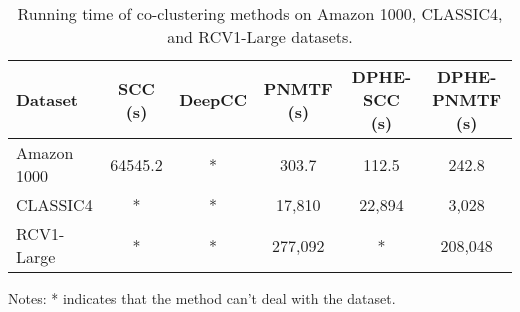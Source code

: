 
\begin{table*}[htbp]
    \centering
    \caption{Running time of co-clustering methods on Amazon 1000, CLASSIC4, and RCV1-Large datasets.}
    \label{tab:running-time}
    \begin{tabular}{@{} l ccccc @{}}
        \toprule
        Dataset     & SCC (s) & DeepCC & PNMTF (s) & DPHE-SCC (s) & DPHE-PNMTF (s) \\
        \midrule
        Amazon 1000 & 64545.2 & *      & 303.7     & 112.5     & 242.8       \\
        CLASSIC4    & *       & *      & 17,810    & 22,894    & 3,028       \\
        RCV1-Large  & *       & *      & 277,092   & *         & 208,048     \\
        \bottomrule
    \end{tabular}
    \begin{tablenotes}
        \small
        \item Notes: * indicates that the method can't deal with the dataset.
    \end{tablenotes}
\end{table*}

